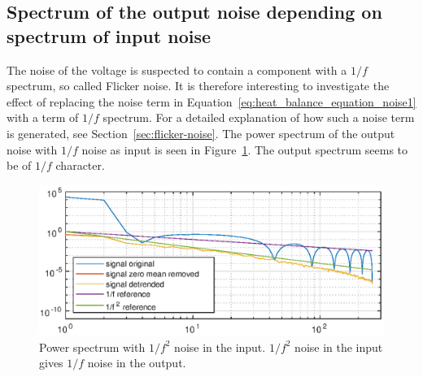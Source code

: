 \subsection{Spectrum of the output noise depending on spectrum of input noise}
The noise of the voltage is suspected to contain a component with a
$1/f$ spectrum, so called Flicker noise. It is therefore interesting
to investigate the effect of replacing the noise term in
Equation~\eqref{eq:heat_balance_equation_noise1} with a term of $1/f$
spectrum. For a detailed explanation of how such a noise term is
generated, see Section~\ref{sec:flicker-noise}. The power spectrum
of the output noise with $1/f$ noise as input is seen in
Figure~\ref{fig:power_spectrum_pink}. The output spectrum seems to be
of $1/f$ character.

\begin{figure}[H]
\includegraphics[scale=0.9]{gfx/spectrum_pink_noise.eps}
\caption{Power spectrum with $1/f^2$ noise in the input. $1/f^2$ noise
  in the input gives $1/f$ noise in the output.}
\label{fig:power_spectrum_pink}
\end{figure}


